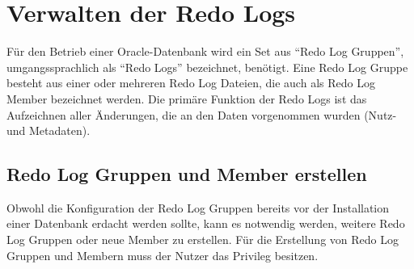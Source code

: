     \section{Verwalten der Redo Logs}
      F\"ur den Betrieb einer Oracle-Datenbank wird ein Set aus \enquote{Redo Log Gruppen}, umgangssprachlich als \enquote{Redo Logs} bezeichnet, ben\"otigt. Eine Redo Log Gruppe besteht aus einer oder mehreren Redo Log Dateien, die auch als Redo Log Member bezeichnet werden. Die prim\"are Funktion der Redo Logs ist das Aufzeichnen aller \"Anderungen, die an den Daten vorgenommen wurden (Nutz- und Metadaten).
      \subsection{Redo Log Gruppen und Member erstellen}
        Obwohl die Konfiguration der Redo Log Gruppen bereits vor der Installation einer Datenbank erdacht werden sollte, kann es notwendig werden, weitere Redo Log Gruppen oder neue Member zu erstellen. F\"ur die Erstellung von Redo Log Gruppen und Membern muss der Nutzer das Privileg  besitzen.

